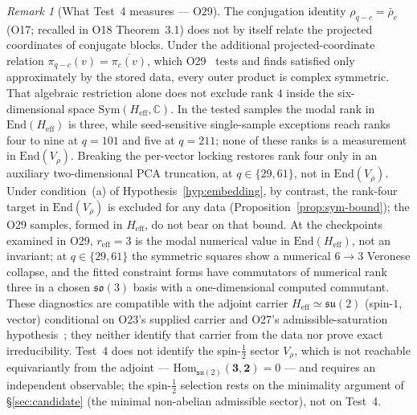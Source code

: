 \documentclass[12pt,a4paper]{article}
\theoremstyle{definition}
\theoremstyle{remark}
\newtheorem{remark}[theorem]{Remark}
\begin{document}
    \begin{remark}[What Test~4 measures --- O29]
      \label{rem:criterion-reform}
      The conjugation identity $\rho_{q-c} = \bar\rho_c$ (O17; recalled in O18 Theorem~3.1)
      does not by itself relate the projected coordinates of conjugate blocks.
      Under the additional projected-coordinate relation $\pi_{q-c}(v) = \overline{\pi_c(v)}$, which
      O29~\cite{Beau2026a33} tests and finds satisfied only approximately by the stored data, every
      outer product is complex symmetric.
      That algebraic restriction alone does not exclude rank $4$ inside the six-dimensional space
      $\mathrm{Sym}(H_{\mathrm{eff}}, \mathbb{C})$.
      In the tested samples the modal rank in $\mathrm{End}(H_{\mathrm{eff}})$ is three, while seed-sensitive
      single-sample exceptions reach ranks four to nine at $q = 101$ and five at $q = 211$; none of these
      ranks is a measurement in $\mathrm{End}(V_\rho)$.
      Breaking the per-vector locking restores rank four only in an auxiliary two-dimensional PCA
      truncation, at $q \in \{29, 61\}$, not in $\mathrm{End}(V_\rho)$.
      Under condition~(a) of Hypothesis~\ref{hyp:embedding}, by contrast, the rank-four target in
      $\mathrm{End}(V_\rho)$ is excluded for any data (Proposition~\ref{prop:sym-bound}); the O29
      samples, formed in $H_{\mathrm{eff}}$, do not bear on that bound.
      At the checkpoints examined in O29, $r_{\mathrm{eff}} = 3$ is the modal numerical value in
      $\mathrm{End}(H_{\mathrm{eff}})$, not an invariant; at $q \in \{29, 61\}$ the symmetric squares show a
      numerical $6 \to 3$
      Veronese collapse, and the fitted constraint forms have commutators of numerical rank three in a
      chosen $\mathfrak{so}(3)$ basis with a one-dimensional computed commutant.
      These diagnostics are compatible with the adjoint carrier $H_{\mathrm{eff}} \simeq \mathfrak{su}(2)$
      (spin-$1$, vector) conditional on O23's supplied carrier and O27's admissible-saturation
      hypothesis~\cite{Beau2026a31}; they neither identify
      that carrier from the data nor prove exact irreducibility.
      Test~4 does not identify the spin-$\tfrac{1}{2}$ sector $V_\rho$, which is not reachable
      equivariantly from the adjoint --- $\mathrm{Hom}_{\mathfrak{su}(2)}(\mathbf{3},\mathbf{2}) = 0$
      --- and requires an independent observable; the spin-$\tfrac{1}{2}$
      selection rests on the minimality argument of §\ref{sec:candidate} (the minimal non-abelian admissible
      sector), not on Test~4.
    \end{remark}
\end{document}

